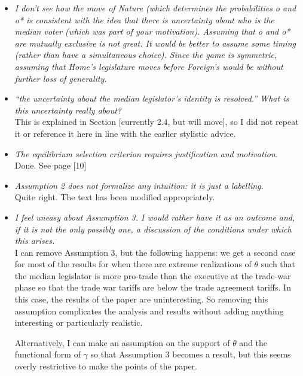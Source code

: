\documentclass[12pt]{report}
\begin{document}
\begin{itemize}
  \item \textit{I don't see how the move of Nature (which determines the probabilities o and o* is consistent with the idea that there is uncertainty about who is the median voter (which was part of your motivation). Assuming that o and o* are mutually exclusive is not great. It would be better to assume some timing (rather than have a simultaneous choice). Since the game is symmetric, assuming that Home’s legislature moves before Foreign's would be without further loss of generality.}
  \item \textit{``the uncertainty about the median legislator's identity is resolved.'' What is this uncertainty really about?} \\
	This is explained in Section [currently 2.4, but will move], so I did not repeat it or reference it here in line with the earlier stylistic advice.
	
  \item \textit{The equilibrium selection criterion requires justification and motivation.} \\
	Done. See page [10]
	
  \item \textit{Assumption 2 does not formalize any intuition: it is just a labelling.} \\
	Quite right. The text has been modified appropriately.
  \item \textit{I feel uneasy about Assumption 3. I would rather have it as an outcome and, if it is not the only possibly one, a discussion of the conditions under which this arises.} \\
	I can remove Assumption 3, but the following happens: we get a second case for most of the results for when there are extreme realizations of $\theta$ such that the median legislator is more pro-trade than the executive at the trade-war phase so that the trade war tariffs are below the trade agreement tariffs. In this case, the results of the paper are uninteresting. So removing this assumption complicates the analysis and results without adding anything interesting or particularly realistic.
	
	Alternatively, I can make an assumption on the support of $\theta$ and the functional form of $\gamma$ so that Assumption 3 becomes a result, but this seems overly restrictive to make the points of the paper.
	

\end{itemize}
\end{document}
